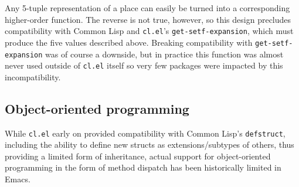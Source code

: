 \documentclass[format=acmsmall, review]{acmart}
\begin{document}
Any 5-tuple representation of a place can easily be turned into
a corresponding higher-order function.  The reverse is not true, however, so
this design precludes compatibility with Common Lisp and
\texttt{cl.el}'s \texttt{get-setf-expansion}, which must produce the
five values described above.
Breaking compatibility with \texttt{get-setf-expansion}
was of course
a downside, but in practice this function was almost never used outside of
\texttt{cl.el} itself so very few packages were impacted by
this incompatibility.


\subsection{Object-oriented programming} %
\label{sec:oop}

While \texttt{cl.el} early on provided compatibility with Common
Lisp's \texttt{defstruct}, including the
ability to define new structs as extensions/subtypes of others, thus
providing a limited form of inheritance, actual support for object-oriented
programming in the form of method dispatch has been historically limited
in Emacs.
\end{document}
